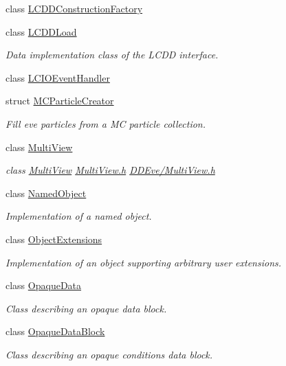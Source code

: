 \begin{DoxyCompactItemize}
class \hyperlink{class_d_d4hep_1_1_l_c_d_d_construction_factory}{L\+C\+D\+D\+Construction\+Factory}
\item 
class \hyperlink{class_d_d4hep_1_1_l_c_d_d_load}{L\+C\+D\+D\+Load}
\begin{DoxyCompactList}\small\item\em Data implementation class of the L\+C\+DD interface. \end{DoxyCompactList}\item 
class \hyperlink{class_d_d4hep_1_1_l_c_i_o_event_handler}{L\+C\+I\+O\+Event\+Handler}
\item 
struct \hyperlink{struct_d_d4hep_1_1_m_c_particle_creator}{M\+C\+Particle\+Creator}
\begin{DoxyCompactList}\small\item\em Fill eve particles from a MC particle collection. \end{DoxyCompactList}\item 
class \hyperlink{class_d_d4hep_1_1_multi_view}{Multi\+View}
\begin{DoxyCompactList}\small\item\em class \hyperlink{class_d_d4hep_1_1_multi_view}{Multi\+View} \hyperlink{_multi_view_8h}{Multi\+View.\+h} \hyperlink{_multi_view_8h}{D\+D\+Eve/\+Multi\+View.\+h} \end{DoxyCompactList}\item 
class \hyperlink{class_d_d4hep_1_1_named_object}{Named\+Object}
\begin{DoxyCompactList}\small\item\em Implementation of a named object. \end{DoxyCompactList}\item 
class \hyperlink{class_d_d4hep_1_1_object_extensions}{Object\+Extensions}
\begin{DoxyCompactList}\small\item\em Implementation of an object supporting arbitrary user extensions. \end{DoxyCompactList}\item 
class \hyperlink{class_d_d4hep_1_1_opaque_data}{Opaque\+Data}
\begin{DoxyCompactList}\small\item\em Class describing an opaque data block. \end{DoxyCompactList}\item 
class \hyperlink{class_d_d4hep_1_1_opaque_data_block}{Opaque\+Data\+Block}
\begin{DoxyCompactList}\small\item\em Class describing an opaque conditions data block. \end{DoxyCompactList}\item 

\end{DoxyCompactItemize}
